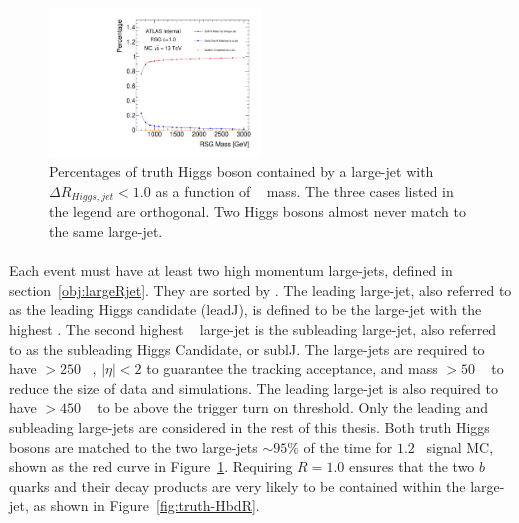 \begin{figure}[htbp!]
  \begin{center}
  \includegraphics[width=0.5\textwidth,angle=-90]{figures/boosted/Truth/truth_higgs-matching.pdf}
  \caption{Percentages of truth Higgs boson contained by a large-\R jet with $\Delta R_{Higgs, jet}<1.0$ as a function of \Grav~ mass. The three cases listed in the legend are orthogonal. Two Higgs bosons almost never match to the same large-\R jet.}
  \label{fig:truth-Higgs-largeRjet}
\end{center}
\end{figure}

\paragraph{}
Each event must have at least two high momentum large-\R jets, defined in section~\ref{obj:largeRjet}.
They are sorted by \pt.
The leading large-\R jet, also referred to as the leading Higgs candidate (leadJ), is defined to be the large-\R jet with the highest \pt.
The second highest \pt~ large-\R jet is the subleading large-\R jet, also referred to as the subleading Higgs Candidate, or sublJ.
The large-\R jets are required to have \pt $> 250$ \GeV~, $|\eta| < 2$ to guarantee the tracking acceptance, and mass $> 50$ \GeV~ to reduce the size of data and simulations.
The leading large-\R jet is also required to have \pt $> 450$ \GeV~ to be above the trigger turn on threshold.
Only the leading and subleading large-\R jets are considered in the rest of this thesis.
Both truth Higgs bosons are matched to the two large-\R jets $\sim 95\%$ of the time for $1.2$\TeV~ signal MC, shown as the red curve in Figure~\ref{fig:truth-Higgs-largeRjet}. 
Requiring $R = 1.0$ ensures that the two $b$ quarks and their decay products are very likely to be contained within the large-\R jet, as shown in Figure~\ref{fig:truth-HbdR}. 


